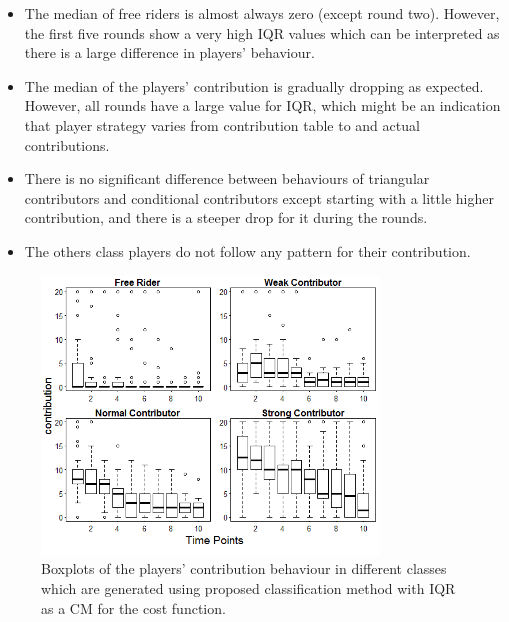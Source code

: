\begin{itemize}
    \item The median of free riders is almost always zero (except round two). However, the first five rounds show a very high IQR values which can be interpreted as there is a large difference in players' behaviour. 
    
    \item The median of the players' contribution is gradually dropping as expected. However, all rounds have a large value for IQR, which might be an indication that player strategy varies from contribution table to and actual contributions.
    
    \item There is no significant difference between behaviours of triangular contributors and conditional contributors except starting with a little higher contribution, and there is a steeper drop for it during the rounds.
    
    \item The others class players do not follow any pattern for their contribution.
\end{itemize}


\begin{figure}[!h]
    \centering
    \includegraphics[width=0.8\textwidth]{images/chapter5/IQRCost_PGG10_Boxplot.png}
    \caption{Boxplots of the players' contribution behaviour in different classes which are generated using proposed classification method with IQR as a CM for the cost function.}
    \label{fig:IQRCost_PGG10_Boxplot}
\end{figure}

